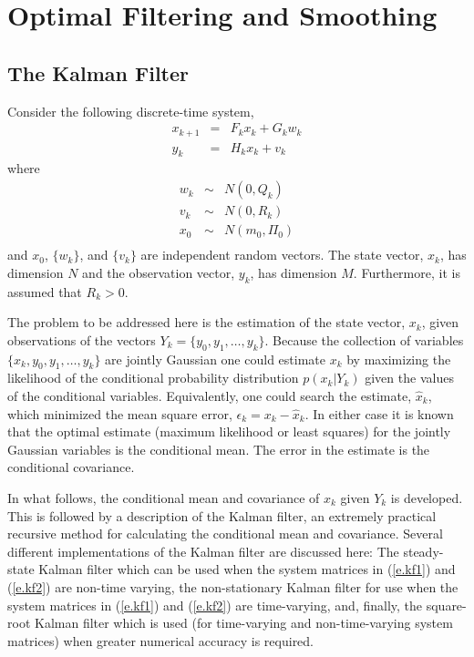 \chapter{Optimal Filtering and Smoothing}

\section{The Kalman Filter}

	Consider the following discrete-time system,
%
\begin{eqnarray}
x_{k+1}&=&F_kx_k+G_kw_k\nonumber\\
y_k&=&H_kx_k+v_k
\label{e.kf1}
\end{eqnarray}
%
where
%
\begin{eqnarray}
w_k&\sim&N(0,Q_k)\nonumber\\
v_k&\sim&N(0,R_k)\nonumber\\
x_0&\sim&N(m_0,\Pi_0)\nonumber\\
\label{e.kf1a}
\end{eqnarray}
%
and $x_0$, $\{w_k\}$, and $\{v_k\}$ are independent random vectors.
The state vector, $x_k$, has dimension $N$ and the observation
vector, $y_k$, has dimension $M$.  Furthermore, it is assumed that
$R_k>0$.

	The problem to be addressed here is the estimation
of the state vector, $x_k$, given observations of the vectors
$Y_k=\{y_0,y_1,\ldots,y_k\}$.  Because the collection of variables
$\{x_k,y_0,y_1,\ldots,y_k\}$ are jointly Gaussian 
one could estimate $x_k$ by maximizing the likelihood
of the conditional probability distribution $p(x_k|Y_k)$
given the values of the conditional variables.  Equivalently,
one could search the estimate, $\hat{x}_k$, which minimized the
mean square error, $\epsilon_k=x_k-\hat{x}_k$.  In either case it
is known that the optimal estimate (maximum likelihood or least
squares) for the jointly Gaussian variables is the conditional mean.
The error in the estimate is the conditional covariance.

	In what follows, the conditional mean and covariance
of $x_k$ given $Y_k$ is developed.  This is followed by
a description of the Kalman filter, an extremely practical
recursive method for calculating the conditional mean and covariance.
Several different implementations of the Kalman filter are discussed
here:  The steady-state Kalman filter which can be used when
the system matrices in (\ref{e.kf1}) and (\ref{e.kf2}) are non-time varying, 
the non-stationary Kalman filter for use when the system matrices in
(\ref{e.kf1}) and (\ref{e.kf2}) 
are time-varying, and, finally, the square-root
Kalman filter which is used (for time-varying and non-time-varying
system matrices) when greater numerical accuracy is required.

